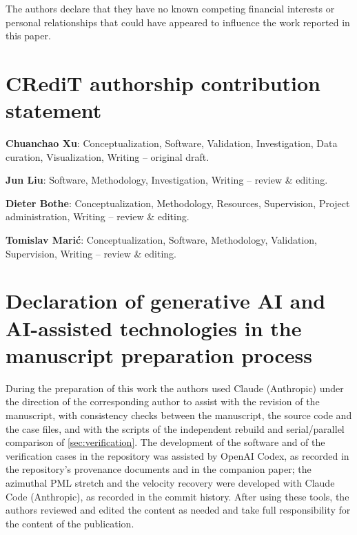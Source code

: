 \documentclass[final,12pt,nopreprintline]{elsarticle}
\begin{document}
The authors declare that they have no known competing financial interests or
personal relationships that could have appeared to influence the work reported
in this paper.

\section*{CRediT authorship contribution statement}

\noindent\textbf{Chuanchao Xu}: Conceptualization, Software, Validation,
Investigation, Data curation, Visualization, Writing -- original draft.

\noindent\textbf{Jun Liu}: Software, Methodology, Investigation, Writing --
review \& editing.

\noindent\textbf{Dieter Bothe}: Conceptualization, Methodology, Resources,
Supervision, Project administration, Writing -- review \& editing.

\noindent\textbf{Tomislav Mari\'{c}}: Conceptualization, Software, Methodology,
Validation, Supervision, Writing -- review \& editing.

\section*{Declaration of generative AI and AI-assisted technologies in the manuscript preparation process}

During the preparation of this work the authors used Claude (Anthropic) under
the direction of the corresponding author to assist with the revision of the
manuscript, with consistency checks between the manuscript, the source code
and the case files, and with the scripts of the independent rebuild and
serial/parallel comparison of \cref{sec:verification}.  The development of the
software and of the verification cases in the repository was assisted by
OpenAI Codex, as recorded in the repository's provenance documents and in the
companion paper; the azimuthal PML stretch and the velocity recovery were
developed with Claude Code (Anthropic), as recorded in the commit history.  After using these tools, the authors reviewed and edited the
content as needed and take full responsibility for the content of the
publication.



\end{document}
